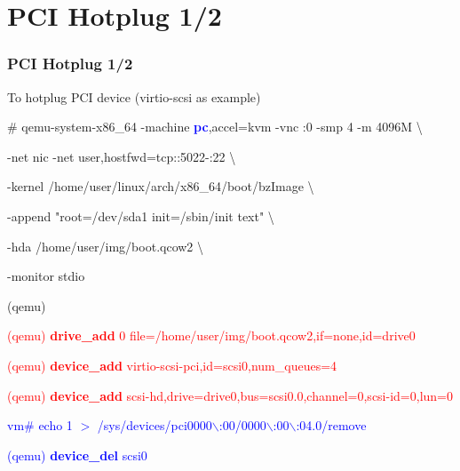 \documentclass[aspectratio=169]{beamer}
\begin{document}
\section{PCI Hotplug 1/2}
\begin{frame}
\frametitle{PCI Hotplug 1/2}
To hotplug PCI device (virtio-scsi as example)
\begin{block}{}
\small
\# qemu-system-x86\_64 -machine \textbf{\textcolor{blue}{pc}},accel=kvm -vnc :0 -smp 4 -m 4096M \textbackslash

-net nic -net user,hostfwd=tcp::5022-:22 \textbackslash

-kernel /home/user/linux/arch/x86\_64/boot/bzImage \textbackslash
	
-append "root=/dev/sda1 init=/sbin/init text" \textbackslash

-hda /home/user/img/boot.qcow2 \textbackslash

-monitor stdio

(qemu)
\end{block}
\begin{block}{}
\textcolor{red}{(qemu) \textbf{drive\_add} 0 file=/home/user/img/boot.qcow2,if=none,id=drive0}

\textcolor{red}{(qemu) \textbf{device\_add} virtio-scsi-pci,id=scsi0,num\_queues=4}

\textcolor{red}{(qemu) \textbf{device\_add} scsi-hd,drive=drive0,bus=scsi0.0,channel=0,scsi-id=0,lun=0} \newline

\textcolor{blue}{vm\# echo 1 $>$ /sys/devices/pci0000$\backslash$:00/0000$\backslash$:00$\backslash$:04.0/remove}

\textcolor{blue}{(qemu) \textbf{device\_del} scsi0}
\end{block}
\end{frame}

\end{document}
